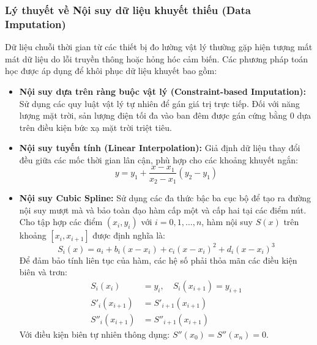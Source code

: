 \documentclass[12pt,a4paper]{article}
\begin{document}
\subsubsection{Lý thuyết về Nội suy dữ liệu khuyết thiếu (Data Imputation)}
Dữ liệu chuỗi thời gian từ các thiết bị đo lường vật lý thường gặp hiện tượng mất mát dữ liệu do lỗi truyền thông hoặc hỏng hóc cảm biến. Các phương pháp toán học được áp dụng để khôi phục dữ liệu khuyết bao gồm:
\begin{itemize}
    \item \textbf{Nội suy dựa trên ràng buộc vật lý (Constraint-based Imputation):} Sử dụng các quy luật vật lý tự nhiên để gán giá trị trực tiếp. Đối với năng lượng mặt trời, sản lượng điện tối đa vào ban đêm được gán cứng bằng 0 dựa trên điều kiện bức xạ mặt trời triệt tiêu.
    
    \item \textbf{Nội suy tuyến tính (Linear Interpolation):} Giả định dữ liệu thay đổi đều giữa các mốc thời gian lân cận, phù hợp cho các khoảng khuyết ngắn:
    \begin{equation}
        y = y_1 + \frac{x - x_1}{x_2 - x_1} (y_2 - y_1)
    \end{equation}

    \item \textbf{Nội suy Cubic Spline:} Sử dụng các đa thức bậc ba cục bộ để tạo ra đường nội suy mượt mà và bảo toàn đạo hàm cấp một và cấp hai tại các điểm nút. Cho tập hợp các điểm $(x_i, y_i)$ với $i = 0, 1, \dots, n$, hàm nội suy $S(x)$ trên khoảng $[x_i, x_{i+1}]$ được định nghĩa là:
    \begin{equation}
        S_i(x) = a_i + b_i(x - x_i) + c_i(x - x_i)^2 + d_i(x - x_i)^3
    \end{equation}
    Để đảm bảo tính liên tục của hàm, các hệ số phải thỏa mãn các điều kiện biên và trơn:
    \begin{align}
        S_i(x_i) &= y_i, \quad S_i(x_{i+1}) = y_{i+1} \\
        S'_i(x_{i+1}) &= S'_{i+1}(x_{i+1}) \\
        S''_i(x_{i+1}) &= S''_{i+1}(x_{i+1})
    \end{align}
    Với điều kiện biên tự nhiên thông dụng: $S''(x_0) = S''(x_n) = 0$.


\end{itemize}
\end{document}
